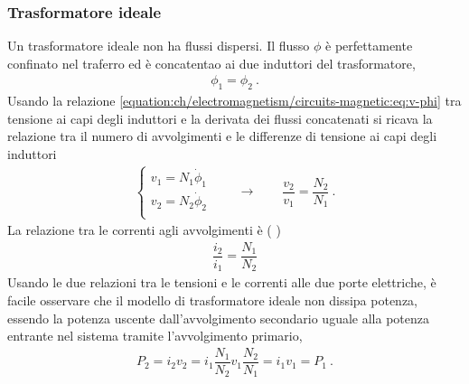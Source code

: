 \documentclass[letterpaper,10pt,italian]{jupyterBook}
\begin{document}
\subsubsection{Trasformatore ideale}
\label{\detokenize{ch/electromagnetism/circuits-magnetic:trasformatore-ideale}}\label{\detokenize{ch/electromagnetism/circuits-magnetic:physics-hs-electromagnetism-circuits-magnetic-transformer-ideal}}
\sphinxAtStartPar
Un trasformatore ideale non ha flussi dispersi. Il flusso \(\phi\) è perfettamente confinato nel traferro ed è concatentao ai due induttori del trasformatore,
\begin{equation*}
\begin{split}\phi_1 = \phi_2 \ .\end{split}
\end{equation*}
\sphinxAtStartPar
Usando la relazione \eqref{equation:ch/electromagnetism/circuits-magnetic:eq:v-phi} tra tensione ai capi degli induttori e la derivata dei flussi concatenati si ricava la relazione tra il numero di avvolgimenti e le differenze di tensione ai capi degli induttori
\begin{equation}\label{equation:ch/electromagnetism/circuits-magnetic:eq:transformer:ideal:v-ratio}
\begin{split}\begin{cases}
  v_1 = N_1 \dot{\phi}_1 \\
  v_2 = N_2 \dot{\phi}_2 \\
\end{cases}
\qquad \rightarrow \qquad
\dfrac{v_2}{v_1} = \dfrac{N_2}{N_1} \ .
\end{split}
\end{equation}
\sphinxAtStartPar
La relazione tra le correnti agli avvolgimenti è ( )
\begin{equation}\label{equation:ch/electromagnetism/circuits-magnetic:eq:transformer:ideal:v-ratio}
\begin{split}\dfrac{i_2}{i_1} = \dfrac{N_1}{N_2}\end{split}
\end{equation}
\sphinxAtStartPar
Usando le due relazioni tra le tensioni e le correnti alle due porte elettriche, è facile osservare che il modello di trasformatore ideale non dissipa potenza, essendo la potenza uscente dall’avvolgimento secondario uguale alla potenza entrante nel sistema tramite l’avvolgimento primario,
\begin{equation*}
\begin{split}P_2 = i_2 v_2 = i_1 \dfrac{N_1}{N_2} v_1 \dfrac{N_2}{N_1} = i_1 v_1 = P_1 \ .\end{split}
\end{equation*}
\end{document}
